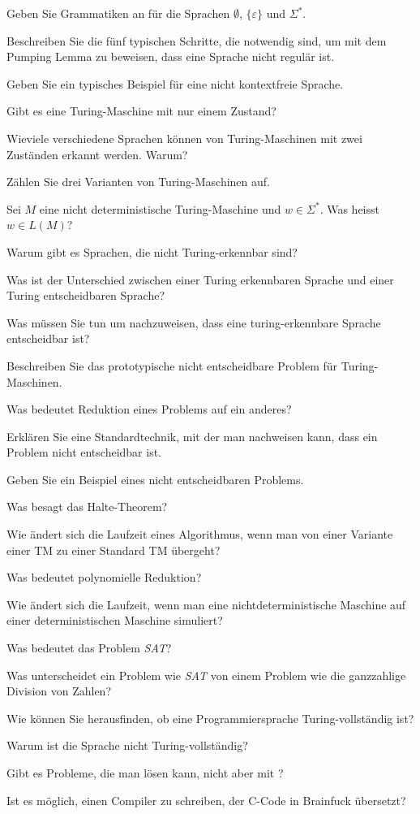 \documentclass[a4paper,12pt,twocolumn]{article}
\begin{document}
\begin{compactenum}
\item Geben Sie Grammatiken an für die Sprachen $\emptyset$,
$\{\varepsilon\}$ und $\Sigma^*$.
\item Beschreiben Sie die fünf typischen Schritte, die notwendig sind,
um mit dem Pumping Lemma zu beweisen, dass eine Sprache nicht regulär ist.
\item Geben Sie ein typisches Beispiel für eine nicht kontextfreie Sprache.
\item Gibt es eine Turing-Maschine mit nur einem Zustand?
\item Wieviele verschiedene Sprachen können von 
Turing-Maschinen mit zwei Zuständen erkannt werden. Warum?
\item Zählen Sie drei Varianten von Turing-Maschinen auf.
\item Sei $M$ eine nicht deterministische Turing-Maschine und $w\in\Sigma^*$.
Was heisst $w\in L(M)$?
\item Warum gibt es Sprachen, die nicht Turing-erkennbar sind?
\item Was ist der Unterschied zwischen einer Turing erkennbaren Sprache
und einer Turing entscheidbaren Sprache?
\item Was müssen Sie tun um nachzuweisen, dass eine turing-erkennbare
Sprache entscheidbar ist?
\item Beschreiben Sie das prototypische nicht entscheidbare Problem für
Turing-Maschinen.
\item Was bedeutet Reduktion eines Problems auf ein anderes?
\item Erklären Sie eine Standardtechnik, mit der man nachweisen kann,
dass ein Problem nicht entscheidbar ist.
\item Geben Sie ein Beispiel eines nicht entscheidbaren Problems.
\item Was besagt das Halte-Theorem?
\item Wie ändert sich die Laufzeit eines Algorithmus, wenn man von einer
Variante einer TM zu einer Standard TM übergeht?
\item Was bedeutet polynomielle Reduktion?
\item Wie ändert sich die Laufzeit, wenn man eine nichtdeterministische
Maschine auf einer deterministischen Maschine simuliert?
\item Was bedeutet das Problem \textsl{SAT}?
\item Was unterscheidet ein Problem wie \textsl{SAT} von einem Problem wie
die ganzzahlige Division von Zahlen?
\item Wie können Sie herausfinden, ob eine Programmiersprache
Turing-vollständig ist?
\item Warum ist die Sprache  nicht Turing-vollständig?
\item Gibt es Probleme, die man  lösen kann, nicht
aber mit ?
\item Ist es möglich, einen Compiler zu schreiben, der C-Code in 
Brainfuck übersetzt?
\end{compactenum}
\end{document}
